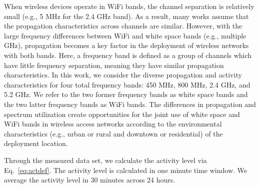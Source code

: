 When wireless devices operate in WiFi bands, the channel separation is relatively 
small (e.g., 5 MHz for the 2.4 GHz band). As a result, many works assume that
the propagation characteristics across channels are similar. However, with the
large frequency differences between WiFi and white space bands (e.g., multiple GHz),
propagation becomes a key factor in the deployment of wireless networks with both bands.
Here, a frequency band is defined as a group of channels which have
little frequency separation, meaning they have similar propagation characteristics.
In this work, we consider the diverse propagation and activity characteristics
for four total frequency bands: 450 MHz, 800 MHz, 2.4 GHz, and 5.2 GHz.
We refer to the two former frequency bands as white space bands and
the two latter frequency bands as WiFi bands.
The differences in propagation and spectrum utilization create opportunities
for the joint use of white space and WiFi bands in wireless access networks according
to the environmental characteristics (e.g., urban or rural and downtown or residential)
of the deployment location.


Through the measured data set, we calculate the activity level via Eq.~\ref{eq:actdef}.
The activity level is calculated in one minute time window.
We average the activity level in 30 minutes across 24 hours.



